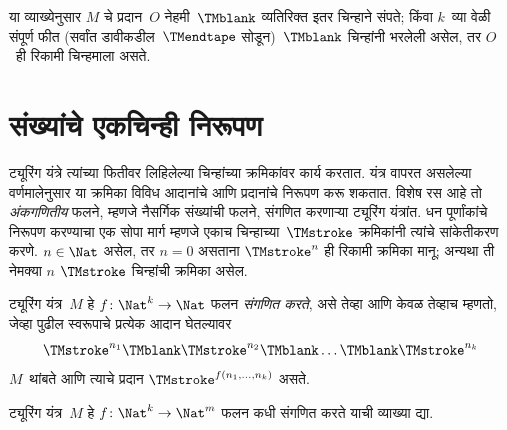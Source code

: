 \begin{explain}
या व्याख्येनुसार $M$ चे प्रदान~$O$ नेहमी~$\TMblank$ व्यतिरिक्त
इतर चिन्हाने संपते; किंवा $k$~व्या वेळी संपूर्ण फीत (सर्वांत
डावीकडील~$\TMendtape$ सोडून)~$\TMblank$ चिन्हांनी भरलेली असेल,
तर $O$~ही रिकामी चिन्हमाला असते.
\end{explain}











\section{संख्यांचे एकचिन्ही निरूपण}\label{tur:mac:una:sec}

\begin{explain}
ट्यूरिंग यंत्रे त्यांच्या फितीवर लिहिलेल्या चिन्हांच्या क्रमिकांवर
कार्य करतात. यंत्र वापरत असलेल्या वर्णमालेनुसार या क्रमिका विविध
आदानांचे आणि प्रदानांचे निरूपण करू शकतात. विशेष रस आहे तो
\emph{अंकगणितीय} फलने, म्हणजे नैसर्गिक संख्यांची फलने, संगणित करणाऱ्या
ट्यूरिंग यंत्रांत. धन पूर्णांकांचे निरूपण करण्याचा एक सोपा मार्ग म्हणजे
एकाच चिन्हाच्या~$\TMstroke$ क्रमिकांनी त्यांचे सांकेतीकरण करणे.
$n \in \Nat$ असेल, तर $n = 0$ असताना $\TMstroke^n$ ही रिकामी
क्रमिका मानू; अन्यथा ती नेमक्या $n$ $\TMstroke$ चिन्हांची क्रमिका
असेल.
\end{explain}

\begin{defn}[संगणन]
ट्यूरिंग यंत्र~$M$ हे $f\colon \Nat^k \to \Nat$ फलन \emph{संगणित
करते}, असे तेव्हा आणि केवळ तेव्हाच म्हणतो, जेव्हा पुढील स्वरूपाचे
प्रत्येक आदान घेतल्यावर
\[\TMstroke^{n_1} \TMblank \TMstroke^{n_2} \TMblank \dots \TMblank \TMstroke^{n_k}
\]
$M$~थांबते आणि त्याचे प्रदान $\TMstroke^{f(n_1, \dots, n_k)}$ असते.
\end{defn}

\begin{prob}
ट्यूरिंग यंत्र~$M$ हे $f\colon \Nat^k \to \Nat^m$ फलन
कधी संगणित करते याची व्याख्या द्या.
\end{prob}

